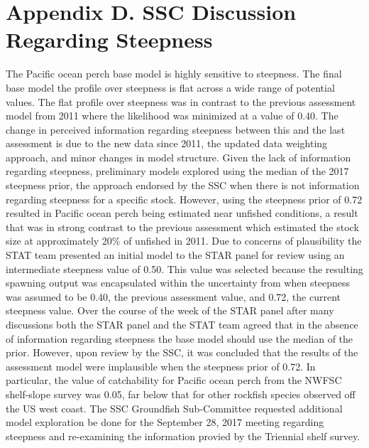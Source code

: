 \documentclass[12pt,]{article}
\begin{document}
\FloatBarrier

\newpage

\section{Appendix D. SSC Discussion Regarding
Steepness}\label{appendix-d.-ssc-discussion-regarding-steepness}

The Pacific ocean perch base model is highly sensitive to steepness. The
final base model the profile over steepness is flat across a wide range
of potential values. The flat profile over steepness was in contrast to
the previous assessment model from 2011 where the likelihood was
minimized at a value of 0.40. The change in perceived information
regarding steepness between this and the last assessment is due to the
new data since 2011, the updated data weighting approach, and minor
changes in model structure. Given the lack of information regarding
steepness, preliminary models explored using the median of the 2017
steepness prior, the approach endorsed by the SSC when there is not
information regarding steepness for a specific stock. However, using the
steepness prior of 0.72 resulted in Pacific ocean perch being estimated
near unfished conditions, a result that was in strong contrast to the
previous assessment which estimated the stock size at approximately 20\%
of unfished in 2011. Due to concerns of plausibility the STAT team
presented an initial model to the STAR panel for review using an
intermediate steepness value of 0.50. This value was selected because
the resulting spawning output was encapsulated within the uncertainty
from when steepness was assumed to be 0.40, the previous assessment
value, and 0.72, the current steepness value. Over the course of the
week of the STAR panel after many discussions both the STAR panel and
the STAT team agreed that in the absence of information regarding
steepness the base model should use the median of the prior. However,
upon review by the SSC, it was concluded that the results of the
assessment model were implausible when the steepness prior of 0.72. In
particular, the value of catchability for Pacific ocean perch from the
NWFSC shelf-slope survey was 0.05, far below that for other rockfish
species observed off the US west coast. The SSC Groundfish Sub-Committee
requested additional model exploration be done for the September 28,
2017 meeting regarding steepness and re-examining the information
provied by the Triennial shelf survey.
\end{document}
